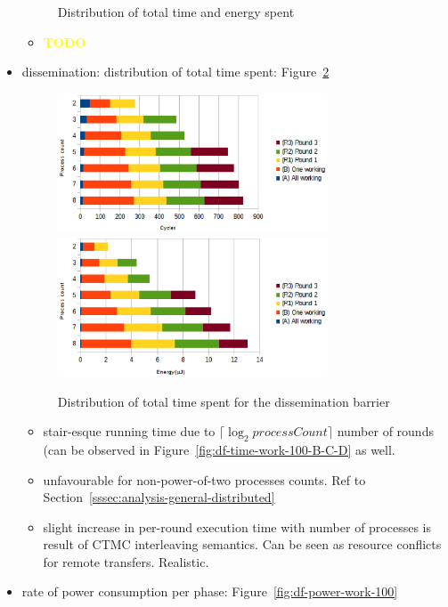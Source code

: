 \documentclass[a4paper, 10pt]{article}
\def \todo{\textbf{\textcolor{yellow}{TODO}}}
\begin{document}
\begin{itemize}
\begin{figure}[htbp]
			\caption{Distribution of total time and energy spent}
			\label{fig:df-work-100-partition}
		\end{figure}
		\begin{itemize}
			\item \todo
		\end{itemize}
	\item dissemination: distribution of total time spent: Figure~\ref{fig:d-work-100-partition}
		\begin{figure}[htbp]
			\centering
			\includegraphics[width=8cm]{charts/d-time-work-100-partition}
			\includegraphics[width=8cm]{charts/d-energy-work-100-partition}
			\caption{Distribution of total time spent for the dissemination barrier}
			\label{fig:d-work-100-partition}
		\end{figure}
		\begin{itemize}
			\item stair-esque running time due to $\lceil \log_2 \mathit{processCount} \rceil$ number of rounds (can be observed in Figure~\ref{fig:df-time-work-100-B-C-D} as well.
			\item unfavourable for non-power-of-two processes counts. Ref to Section~\ref{sssec:analysis-general-distributed}
			\item slight increase in per-round execution time with number of processes is result of CTMC interleaving semantics. Can be seen as resource conflicts for remote transfers. Realistic.
		\end{itemize}
	\item rate of power consumption per phase: Figure~\ref{fig:df-power-work-100}
		\begin{figure}[htbp]
			\centering

\end{figure}
\end{itemize}
\end{document}
